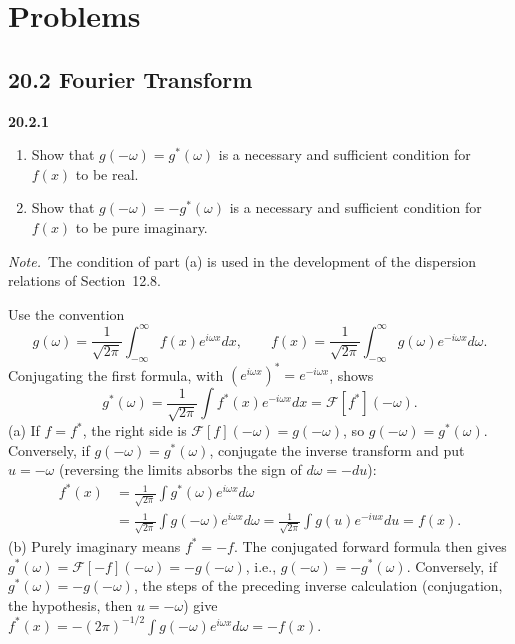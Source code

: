 
\section*{Problems}

\subsection*{20.2 Fourier Transform}

\par\bigskip
\noindent\textbf{20.2.1}
\begin{enumerate}
\item[(a)] Show that $g(-\omega)=g^{*}(\omega)$ is a necessary and
sufficient condition for $f(x)$ to be real.
\item[(b)] Show that $g(-\omega)=-g^{*}(\omega)$ is a necessary and
sufficient condition for $f(x)$ to be pure imaginary.
\end{enumerate}
\par\emph{Note.}~The condition of part (a) is used in the
development of the dispersion relations of Section~12.8.
\par{}
\solution
Use the convention
\[
g(\omega)=\frac1{\sqrt{2\pi}}\int_{-\infty}^{\infty}
f(x)e^{i\omega x}dx,\qquad
f(x)=\frac1{\sqrt{2\pi}}\int_{-\infty}^{\infty}
g(\omega)e^{-i\omega x}d\omega.
\]
Conjugating the first formula, with
$(e^{i\omega x})^*=e^{-i\omega x}$, shows
\[
g^*(\omega)=\frac1{\sqrt{2\pi}}\int f^*(x)e^{-i\omega x}dx
=\mathcal F[f^*](-\omega).
\]
(a) If $f=f^*$, the right side is $\mathcal F[f](-\omega)=g(-\omega)$,
so $g(-\omega)=g^*(\omega)$. Conversely, if
$g(-\omega)=g^*(\omega)$, conjugate the inverse transform and
put $u=-\omega$ (reversing the limits absorbs the sign of
$d\omega=-du$):
\begin{align*}
f^*(x)&=\frac1{\sqrt{2\pi}}\int g^*(\omega)e^{i\omega x}d\omega\\
&=\frac1{\sqrt{2\pi}}\int g(-\omega)e^{i\omega x}d\omega
=\frac1{\sqrt{2\pi}}\int g(u)e^{-iux}du=f(x).
\end{align*}
(b) Purely imaginary means $f^*=-f$. The conjugated forward
formula then gives
$g^*(\omega)=\mathcal F[-f](-\omega)=-g(-\omega)$, i.e.,
$g(-\omega)=-g^*(\omega)$. Conversely, if
$g^*(\omega)=-g(-\omega)$, the steps of the preceding inverse
calculation (conjugation, the hypothesis, then $u=-\omega$) give
$f^*(x)=-(2\pi)^{-1/2}\int g(-\omega)e^{i\omega x}d\omega=-f(x)$.

